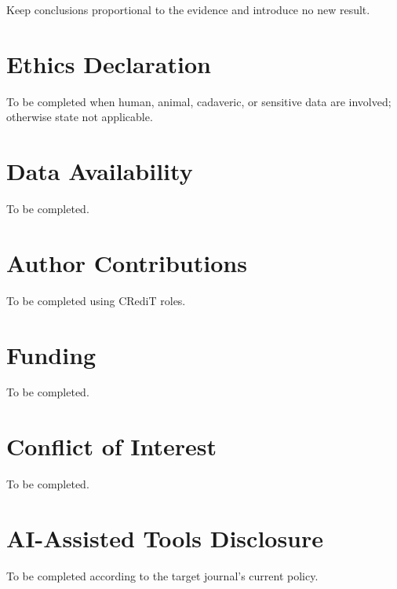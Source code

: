 \documentclass[11pt]{article}
\begin{document}
Keep conclusions proportional to the evidence and introduce no new result.

\section*{Ethics Declaration}
To be completed when human, animal, cadaveric, or sensitive data are involved; otherwise state not applicable.

\section*{Data Availability}
To be completed.

\section*{Author Contributions}
To be completed using CRediT roles.

\section*{Funding}
To be completed.

\section*{Conflict of Interest}
To be completed.

\section*{AI-Assisted Tools Disclosure}
To be completed according to the target journal's current policy.



\end{document}
